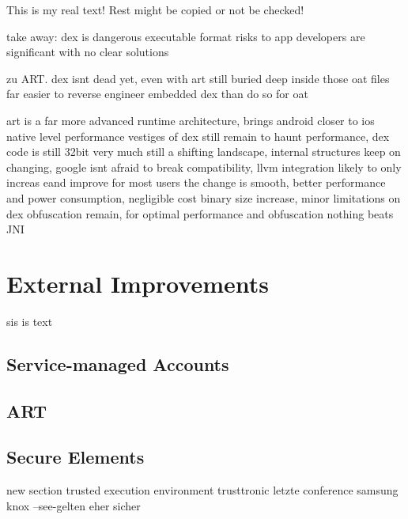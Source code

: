 This is my real text! Rest might be copied or not be checked!

%
take away:
dex is dangerous executable format
risks to app developers are significant with no clear solutions

zu ART.
dex isnt dead yet, even with art
still buried deep inside those oat files
far easier to reverse engineer embedded dex than do so for oat

art is a far more advanced runtime architecture, brings android closer to ios native level performance
vestiges of dex still remain to haunt performance, dex code is still 32bit
very much still a shifting landscape, internal structures keep on changing, google isnt afraid to break compatibility, llvm integration likely to only increas eand improve
for most users the change is smooth, better performance and power consumption, negligible cost binary size increase, minor limitations on dex obfuscation remain, for optimal performance and obfuscation nothing beats JNI
\cite{andevconDalvikART}
%
\section{External Improvements} \label{section:evaluation-setion}
sis is text
\subsection{Service-managed Accounts}
\subsection{ART}
\subsection{Secure Elements}


new section trusted execution environment
trusttronic letzte conference
samsung knox
--see-gelten eher sicher
